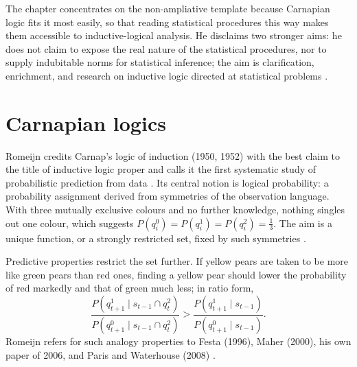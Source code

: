 The chapter concentrates on the non-ampliative template because Carnapian
logic fits it most easily, so that reading statistical procedures this
way makes them accessible to inductive-logical analysis. He disclaims
two stronger aims: he does not claim to expose the real nature of the
statistical procedures, nor to supply indubitable norms for statistical
inference; the aim is clarification, enrichment, and research on
inductive logic directed at statistical problems
\cite[p.~630]{Romeijn2011InductiveLogicStatistics}.

\section{Carnapian logics}
\label{sec:p15-w02c-p15-029-rj-carnap}

Romeijn credits Carnap's logic of induction (1950, 1952) with the best
claim to the title of inductive logic proper and calls it the first
systematic study of probabilistic prediction from data
\cite[p.~630]{Romeijn2011InductiveLogicStatistics}. Its central notion
is logical probability: a probability assignment derived from
symmetries of the observation language. With three mutually exclusive
colours and no further knowledge, nothing singles out one colour, which
suggests \(P(q^0_i)=P(q^1_i)=P(q^2_i)=\tfrac13\). The aim is a unique
function, or a strongly restricted set, fixed by such symmetries
\cite[p.~630]{Romeijn2011InductiveLogicStatistics}.

Predictive properties restrict the set further. If yellow pears are
taken to be more like green pears than red ones, finding a yellow pear
should lower the probability of red markedly and that of green much
less; in ratio form,
\[
 \frac{P(q^1_{t+1}\mid s_{t-1}\cap q^2_t)}{P(q^0_{t+1}\mid s_{t-1}\cap q^2_t)}
 >
 \frac{P(q^1_{t+1}\mid s_{t-1})}{P(q^0_{t+1}\mid s_{t-1})}.
\]
Romeijn refers for such analogy properties to Festa (1996), Maher
(2000), his own paper of 2006, and Paris and Waterhouse (2008)
\cite[p.~630]{Romeijn2011InductiveLogicStatistics}.

